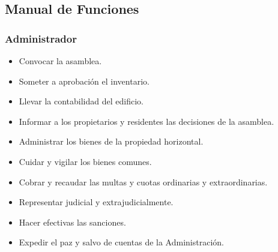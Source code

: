 \subsection{Manual de Funciones}

\subsubsection{Administrador}


\begin{itemize}
\item Convocar la asamblea.
\item Someter a aprobación el inventario.
\item Llevar la contabilidad del edificio.
\item Informar a los propietarios y residentes las decisiones de la asamblea.
\item Administrar los bienes de la propiedad horizontal.
\item Cuidar y vigilar los bienes comunes.
\item Cobrar y recaudar las multas y cuotas ordinarias y extraordinarias.
\item Representar judicial y extrajudicialmente.
\item Hacer efectivas las sanciones.
\item Expedir el paz y salvo de cuentas de la Administración.
\end{itemize}



